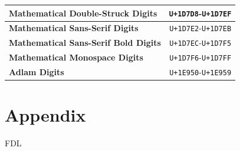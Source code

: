 \documentclass [10pt]{article}
\begin{document}
\begin{center}
\begin{longtable}{|l|c|}
  	\textbf{Mathematical Double-Struck Digits}   & \texttt{U+1D7D8}-\texttt{U+1D7EF} \\ \hline
  	\textbf{Mathematical Sans-Serif Digits}      & \texttt{U+1D7E2}-\texttt{U+1D7EB} \\ \hline
  	\textbf{Mathematical Sans-Serif Bold Digits} & \texttt{U+1D7EC}-\texttt{U+1D7F5} \\ \hline
  	\textbf{Mathematical Monospace Digits}       & \texttt{U+1D7F6}-\texttt{U+1D7FF} \\ \hline
  	\textbf{Adlam Digits}                        & \texttt{U+1E950}-\texttt{U+1E959} \\ \hline
  \end{longtable}
\end{center}

\newpage
\section {Appendix}
 {FDL}
\end{document}
